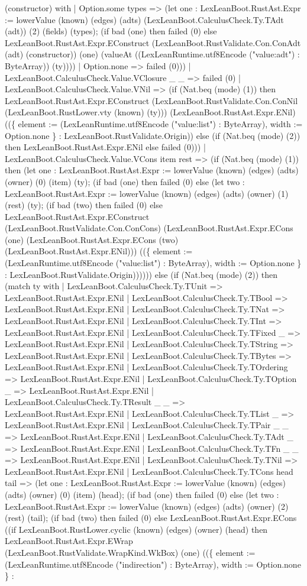 \documentclass[11pt]{article}
\begin{document}
(constructor) with | Option.some types => (let one : LexLeanBoot.RustAst.Expr := lowerValue (known) (edges) (adts) (LexLeanBoot.CalculusCheck.Ty.TAdt (adt)) (2) (fields) (types); (if bad (one) then failed (0) else LexLeanBoot.RustAst.Expr.EConstruct (LexLeanBoot.RustValidate.Con.ConAdt (adt) (constructor)) (one) (valueAt ((LexLeanRuntime.utf8Encode ("value:adt") : ByteArray)) (ty)))) | Option.none => failed (0))) | LexLeanBoot.CalculusCheck.Value.VClosure \_ \_ => failed (0) | LexLeanBoot.CalculusCheck.Value.VNil => (if (Nat.beq (mode) (1)) then LexLeanBoot.RustAst.Expr.EConstruct (LexLeanBoot.RustValidate.Con.ConNil (LexLeanBoot.RustLower.vty (known) (ty))) (LexLeanBoot.RustAst.Expr.ENil) ((\{ element := (LexLeanRuntime.utf8Encode ("value:list") : ByteArray), width := Option.none \} : LexLeanBoot.RustValidate.Origin)) else (if (Nat.beq (mode) (2)) then LexLeanBoot.RustAst.Expr.ENil else failed (0))) | LexLeanBoot.CalculusCheck.Value.VCons item rest => (if (Nat.beq (mode) (1)) then (let one : LexLeanBoot.RustAst.Expr := lowerValue (known) (edges) (adts) (owner) (0) (item) (ty); (if bad (one) then failed (0) else (let two : LexLeanBoot.RustAst.Expr := lowerValue (known) (edges) (adts) (owner) (1) (rest) (ty); (if bad (two) then failed (0) else LexLeanBoot.RustAst.Expr.EConstruct (LexLeanBoot.RustValidate.Con.ConCons) (LexLeanBoot.RustAst.Expr.ECons (one) (LexLeanBoot.RustAst.Expr.ECons (two) (LexLeanBoot.RustAst.Expr.ENil))) ((\{ element := (LexLeanRuntime.utf8Encode ("value:list") : ByteArray), width := Option.none \} : LexLeanBoot.RustValidate.Origin)))))) else (if (Nat.beq (mode) (2)) then (match ty with | LexLeanBoot.CalculusCheck.Ty.TUnit => LexLeanBoot.RustAst.Expr.ENil | LexLeanBoot.CalculusCheck.Ty.TBool => LexLeanBoot.RustAst.Expr.ENil | LexLeanBoot.CalculusCheck.Ty.TNat => LexLeanBoot.RustAst.Expr.ENil | LexLeanBoot.CalculusCheck.Ty.TInt => LexLeanBoot.RustAst.Expr.ENil | LexLeanBoot.CalculusCheck.Ty.TFixed \_ => LexLeanBoot.RustAst.Expr.ENil | LexLeanBoot.CalculusCheck.Ty.TString => LexLeanBoot.RustAst.Expr.ENil | LexLeanBoot.CalculusCheck.Ty.TBytes => LexLeanBoot.RustAst.Expr.ENil | LexLeanBoot.CalculusCheck.Ty.TOrdering => LexLeanBoot.RustAst.Expr.ENil | LexLeanBoot.CalculusCheck.Ty.TOption \_ => LexLeanBoot.RustAst.Expr.ENil | LexLeanBoot.CalculusCheck.Ty.TResult \_ \_ => LexLeanBoot.RustAst.Expr.ENil | LexLeanBoot.CalculusCheck.Ty.TList \_ => LexLeanBoot.RustAst.Expr.ENil | LexLeanBoot.CalculusCheck.Ty.TPair \_ \_ => LexLeanBoot.RustAst.Expr.ENil | LexLeanBoot.CalculusCheck.Ty.TAdt \_ => LexLeanBoot.RustAst.Expr.ENil | LexLeanBoot.CalculusCheck.Ty.TFn \_ \_ => LexLeanBoot.RustAst.Expr.ENil | LexLeanBoot.CalculusCheck.Ty.TNil => LexLeanBoot.RustAst.Expr.ENil | LexLeanBoot.CalculusCheck.Ty.TCons head tail => (let one : LexLeanBoot.RustAst.Expr := lowerValue (known) (edges) (adts) (owner) (0) (item) (head); (if bad (one) then failed (0) else (let two : LexLeanBoot.RustAst.Expr := lowerValue (known) (edges) (adts) (owner) (2) (rest) (tail); (if bad (two) then failed (0) else LexLeanBoot.RustAst.Expr.ECons ((if LexLeanBoot.RustLower.cyclic (known) (edges) (owner) (head) then LexLeanBoot.RustAst.Expr.EWrap (LexLeanBoot.RustValidate.WrapKind.WkBox) (one) ((\{ element := (LexLeanRuntime.utf8Encode ("indirection") : ByteArray), width := Option.none \} : 
\end{document}
